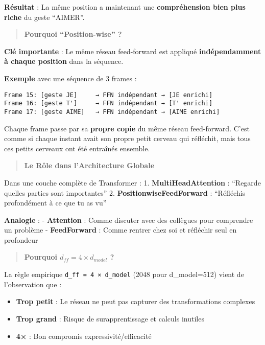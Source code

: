 \documentclass[12pt]{article}
\providecommand{\tightlist}{%
      \setlength{\itemsep}{0pt}\setlength{\parskip}{0pt}}
\begin{document}
\textbf{Résultat} : La même position a maintenant une
\textbf{compréhension bien plus riche} du geste ``AIMER''.

\begin{quote}
\textbf{Pourquoi ``Position-wise'' ?}
\end{quote}

\textbf{Clé importante} : Le même réseau feed-forward est appliqué
\textbf{indépendamment à chaque position} dans la séquence.

\textbf{Exemple} avec une séquence de 3 frames :

\begin{verbatim}
Frame 15: [geste JE]     → FFN indépendant → [JE enrichi]
Frame 16: [geste T']     → FFN indépendant → [T' enrichi]  
Frame 17: [geste AIME]   → FFN indépendant → [AIME enrichi]
\end{verbatim}

Chaque frame passe par sa \textbf{propre copie} du même réseau
feed-forward. C'est comme si chaque instant avait son propre petit
cerveau qui réfléchit, mais tous ces petits cerveaux ont été entraînés
ensemble.

\begin{quote}
\textbf{Le Rôle dans l'Architecture Globale}
\end{quote}

Dans une couche complète de Transformer : 1. \textbf{MultiHeadAttention}
: ``Regarde quelles parties sont importantes'' 2.
\textbf{PositionwiseFeedForward} : ``Réfléchis profondément à ce que tu
as vu''

\textbf{Analogie} : - \textbf{Attention} : Comme discuter avec des
collègues pour comprendre un problème - \textbf{FeedForward} : Comme
rentrer chez soi et réfléchir seul en profondeur

\begin{quote}
\textbf{Pourquoi \(d_{ff} = 4 \times d_{model}\) ?}
\end{quote}

La règle empirique \texttt{d\_ff\ =\ 4\ ×\ d\_model} (2048 pour
d\_model=512) vient de l'observation que :

\begin{itemize}
\tightlist
\item
  \textbf{Trop petit} : Le réseau ne peut pas capturer des
  transformations complexes
\item
  \textbf{Trop grand} : Risque de surapprentissage et calculs inutiles
\item
  \textbf{4×} : Bon compromis expressivité/efficacité
\end{itemize}
\end{document}
